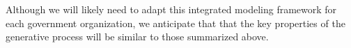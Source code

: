 Although we will likely need to adapt this integrated modeling
framework for each government organization, we anticipate that that
the key properties of the generative process will be similar to those
summarized above.






